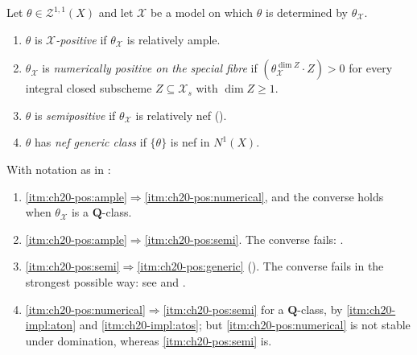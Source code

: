 \begin{definition}
\label{def:ch20-four-positivities}
Let $\theta\in\mathcal Z^{1,1}(X)$ and let $\mathcal X$ be a model on
which $\theta$ is determined by $\theta_{\mathcal X}$.
\begin{enumerate}
\item\label{itm:ch20-pos:ample} $\theta$ is \emph{$\mathcal X$-positive}
 if $\theta_{\mathcal X}$ is relatively ample.
\item\label{itm:ch20-pos:numerical} $\theta_{\mathcal X}$ is
 \emph{numerically positive on the special fibre} if
 $(\theta_{\mathcal X}^{\dim Z}\cdot Z)>0$ for every integral closed
 subscheme $Z\subseteq\mathcal X_s$ with $\dim Z\geq1$.
\item\label{itm:ch20-pos:semi} $\theta$ is \emph{semipositive} if
 $\theta_{\mathcal X}$ is relatively nef
 ().
\item\label{itm:ch20-pos:generic} $\theta$ has \emph{nef generic class}
 if $\{\theta\}$ is nef in $N^1(X)$.
\end{enumerate}
\end{definition}

\begin{theorem}
\label{thm:ch20-positivity-implications}
With notation as in :
\begin{enumerate}
\item\label{itm:ch20-impl:aton}
 \cref{itm:ch20-pos:ample}$\Rightarrow$\cref{itm:ch20-pos:numerical}, and
 the converse holds when $\theta_{\mathcal X}$ is a
 $\mathbf Q$-class.
\item\label{itm:ch20-impl:atos}
 \cref{itm:ch20-pos:ample}$\Rightarrow$\cref{itm:ch20-pos:semi}.  The
 converse fails: .
\item\label{itm:ch20-impl:stog}
 \cref{itm:ch20-pos:semi}$\Rightarrow$\cref{itm:ch20-pos:generic}
 \textup{()}.  The converse fails
 in the strongest possible way: see
  and
 .
\item\label{itm:ch20-impl:ntos}
 \cref{itm:ch20-pos:numerical}$\Rightarrow$\cref{itm:ch20-pos:semi}
 for a $\mathbf Q$-class, by \cref{itm:ch20-impl:aton} and
 \cref{itm:ch20-impl:atos}; but \cref{itm:ch20-pos:numerical} is not stable
 under domination, whereas \cref{itm:ch20-pos:semi} is.
\end{enumerate}
\end{theorem}

